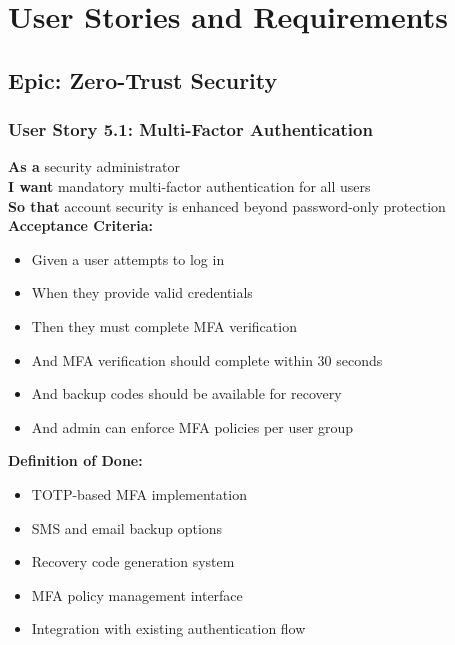 \section{User Stories and Requirements}

\subsection{Epic: Zero-Trust Security}

\subsubsection{User Story 5.1: Multi-Factor Authentication}

\begin{tcolorbox}[colback=lightgray, colframe=primaryblue, title=US-5.1: Multi-Factor Authentication]
\textbf{As a} security administrator \\
\textbf{I want} mandatory multi-factor authentication for all users \\
\textbf{So that} account security is enhanced beyond password-only protection \\

\textbf{Acceptance Criteria:}
\begin{itemize}
    \item Given a user attempts to log in
    \item When they provide valid credentials
    \item Then they must complete MFA verification
    \item And MFA verification should complete within 30 seconds
    \item And backup codes should be available for recovery
    \item And admin can enforce MFA policies per user group
\end{itemize}

\textbf{Definition of Done:}
\begin{itemize}
    \item TOTP-based MFA implementation
    \item SMS and email backup options
    \item Recovery code generation system
    \item MFA policy management interface
    \item Integration with existing authentication flow
\end{itemize}
\end{tcolorbox}

